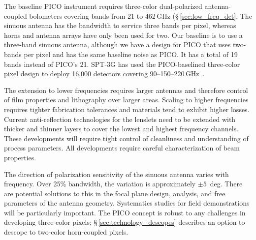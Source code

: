 


The baseline PICO instrument requires three-color dual-polarized antenna-coupled bolometers covering bands from 21 to 462\,GHz
(\S\,\ref{sec:low_freq_det}.  The sinuous antenna has the bandwidth to service three bands per pixel, whereas horns and antenna arrays have only been used for two. Our baseline is to use a three-band sinuous antenna, although we have a design for PICO that uses two-bands per pixel and has the same baseline noise as PICO. It has a total of 19 bands instead of PICO's 21. SPT-3G has used the PICO-baselined three-color pixel design to deploy 16,000 detectors covering 90--150--220\,GHz~\citep{Dutcher2018}.

The extension to lower frequencies requires larger antennas and therefore control of film properties and lithography over larger areas. Scaling to higher frequencies requires tighter fabrication tolerances and materials tend to exhibit higher losses. Current anti-reflection technologies for the lenslets need to be extended with thicker and thinner layers to cover the lowest and highest frequency channels. These developments will require tight control of cleanliness and understanding of process parameters. All developments require careful characterization of beam properties.

The direction of polarization sensitivity of the sinuous antenna varies with frequency. Over 25\% bandwidth, the variation is approximately $\pm 5$~deg.
There are potential solutions to this in the focal plane design, analysis, and free parameters of the antenna geometry.  Systematics studies for field demonstrations will be particularly important. The PICO concept is robust to any challenges in developing three-color pixels; \S\,\ref{sec:technology_descopes} describes an option to descope to two-color horn-coupled pixels.

